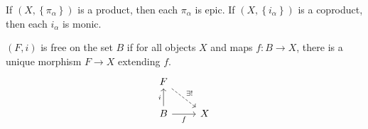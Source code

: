 \documentclass[twoside,10pt]{report}
\begin{document}
\begin{prop}
	If $(X,\left\{ \pi_{\alpha} \right\})$ is a product, then each $\pi_{\alpha}$ is epic. If $(X,\left\{ i_{\alpha} \right\})$ is a coproduct, then each $i_{\alpha}$ is monic.
\end{prop}

\begin{defn}[]
	$(F, i)$ is free on the set $B$ if for all objects $X$ and maps $f:B\to X$, there is a unique morphism $F\to X$ extending $f$.
	\[
	\begin{tikzcd}
		F \arrow[dr,dashed,"\exists!"] \\
		B \uar{i}\rar["f"'] & X
	\end{tikzcd}
	\] 
\end{defn}
\end{document}
